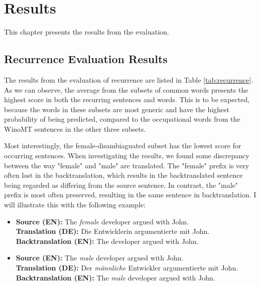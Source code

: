 \chapter{Results}
\label{ch:Results}






This chapter presents the results from the evaluation. 

\section{Recurrence Evaluation Results}
\label{ch:Results:Recurrence}

The results from the evaluation of recurrence are listed in Table \ref{tab:recurrence}.
As we can observe, the average from the subsets of common words presents the highest score in both the recurring sentences and words. This is to be expected, because the words in these subsets are most generic and have the highest probability of being predicted, compared to the occupational words from the WinoMT sentences in the other three subsets. 

Most interestingly, the female-disambiaguated subset has the lowest score for occurring sentences. When investigating the results, we found some discrepancy between the way "female" and "male" are translated. The "female" prefix is very often lost in the backtranslation, which results in the backtranslated sentence being regarded as differing from the source sentence. In contrast, the "male" prefix is most often preserved, resulting in the same sentence in backtranslation. I will illustrate this with the following example:

\begin{itemize}
    \item \textbf{Source (EN):} The \textit{female} developer argued with John. \\
    \textbf{Translation (DE):} Die Entwicklerin argumentierte mit John. \\
    \textbf{Backtranslation (EN):} The developer argued with John.
    
    \item \textbf{Source (EN):} The \textit{male} developer argued with John. \\
    \textbf{Translation (DE):} Der \textit{männliche} Entwickler argumentierte mit John. \\
    \textbf{Backtranslation (EN):} The \textit{male} developer argued with John.
\end{itemize}

